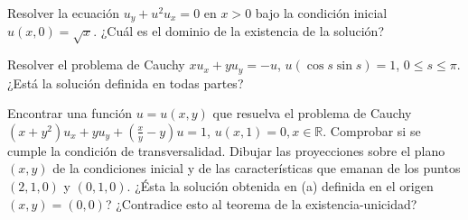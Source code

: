 \begin{problem}[10]
	Resolver la ecuación $u_y + u^2 u_x = 0$ en $x > 0$ bajo la condición inicial $u(x,0) = \sqrt{x}$. ¿Cuál es el dominio de la existencia de la solución?

	\solution
\end{problem}

\begin{problem}[11]
	Resolver el problema de Cauchy $xu_x + yu_y = -u$, $ u(\cos s \sin s) = 1$, $ 0 \leq s \leq \pi$. ¿Está la solución definida en todas partes?

	\solution
\end{problem}

\begin{problem}[12]
	\ppart Encontrar una función $u = u(x,y)$ que resuelva el problema de Cauchy $(x + y^2)u_x + yu_y + (\frac{x}{y} - y) u = 1$, $u(x,1) = 0, x \in \mathbb{R}$.
	\ppart Comprobar si se cumple la condición de transversalidad.
	\ppart Dibujar las proyecciones sobre el plano $(x,y)$ de la condiciones inicial y de las características que emanan de los puntos $(2,1,0)$ y $(0,1,0)$.
	\ppart ¿Ésta la solución obtenida en (a) definida en el origen $(x,y) = (0,0)$? ¿Contradice esto al teorema de la existencia-unicidad?

	\solution

	\spart
	\spart
	\spart
	\spart
\end{problem}


